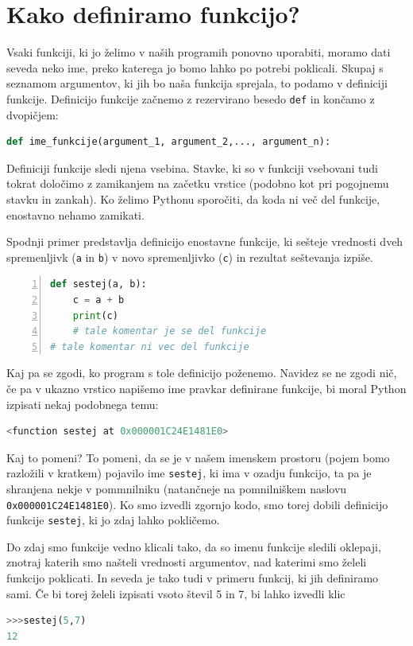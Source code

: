 \section{Kako definiramo funkcijo?}

Vsaki funkciji, ki jo želimo v naših programih ponovno uporabiti, moramo dati seveda neko ime, preko katerega jo bomo lahko po potrebi poklicali. Skupaj s seznamom argumentov, ki jih bo naša funkcija sprejala, to podamo v definiciji funkcije. Definicijo funkcije začnemo z rezervirano besedo \texttt{def} in končamo z dvopičjem:

\begin{lstlisting}[language=Python, showstringspaces=false]
def ime_funkcije(argument_1, argument_2,..., argument_n):
\end{lstlisting}

Definiciji funkcije sledi njena vsebina. Stavke, ki so v funkciji vsebovani tudi tokrat določimo z zamikanjem na začetku vrstice (podobno kot pri pogojnemu stavku in zankah). Ko želimo Pythonu sporočiti, da koda ni več del funkcije, enostavno nehamo zamikati.

Spodnji primer predstavlja definicijo enostavne funkcije, ki sešteje vrednosti dveh spremenljivk (\texttt{a} in \texttt{b}) v novo spremenljivko (\texttt{c}) in rezultat seštevanja izpiše.
\begin{lstlisting}[language=Python, showstringspaces=false,numbers=left]
def sestej(a, b):
    c = a + b
    print(c)
    # tale komentar je se del funkcije
# tale komentar ni vec del funkcije
\end{lstlisting}

Kaj pa se zgodi, ko program s tole definicijo poženemo. Navidez se ne zgodi nič, če pa v ukazno vrstico napišemo ime pravkar definirane funkcije, bi moral Python izpisati nekaj podobnega temu:
\begin{lstlisting}[language=Python, showstringspaces=false]
<function sestej at 0x000001C24E1481E0>
\end{lstlisting}
Kaj to pomeni? To pomeni, da se je v našem imenskem prostoru (pojem bomo razložili v kratkem) pojavilo ime \texttt{sestej}, ki ima v ozadju funkcijo, ta pa je shranjena nekje v pommnilniku (natančneje na pomnilniškem naslovu \texttt{0x000001C24E1481E0}). Ko smo izvedli zgornjo kodo, smo torej dobili definicijo funkcije \texttt{sestej}, ki jo zdaj lahko pokličemo.

Do zdaj smo funkcije vedno klicali tako, da so imenu funkcije sledili oklepaji, znotraj katerih smo našteli vrednosti argumentov, nad katerimi smo želeli funkcijo poklicati. In seveda je tako tudi v primeru funkcij, ki jih definiramo sami. Če bi torej želeli izpisati vsoto števil 5 in 7, bi lahko izvedli klic
\begin{lstlisting}[language=Python, showstringspaces=false]
>>>sestej(5,7)
12
\end{lstlisting}

